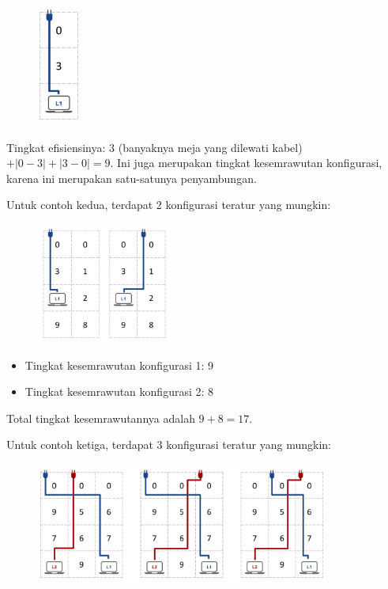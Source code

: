\documentclass[../main_problemset.tex]{subfiles} %
\begin{document}
\begin{figure}[!ht]
	\centering
	\includegraphics[height=150px]{lhompat2/img/sample1}
\end{figure}

Tingkat efisiensinya: $ 3 $ (banyaknya meja yang dilewati kabel) $ + |0-3| + |3-0| = 9 $. Ini juga merupakan tingkat kesemrawutan konfigurasi, karena ini merupakan satu-satunya penyambungan.

\pagebreak
Untuk contoh kedua, terdapat 2 konfigurasi teratur yang mungkin:

\begin{figure}[!ht]
	\centering
	\includegraphics[height=150px]{lhompat2/img/sample2}
\end{figure}

\begin{itemize}
	\item Tingkat kesemrawutan konfigurasi 1: 9
	\item Tingkat kesemrawutan konfigurasi 2: 8
\end{itemize}

Total tingkat kesemrawutannya adalah $ 9 + 8 = 17 $.

Untuk contoh ketiga, terdapat 3 konfigurasi teratur yang mungkin:

\begin{figure}[!ht]
	\centering
	\includegraphics[height=150px]{lhompat2/img/sample3}
\end{figure}
\end{document}
